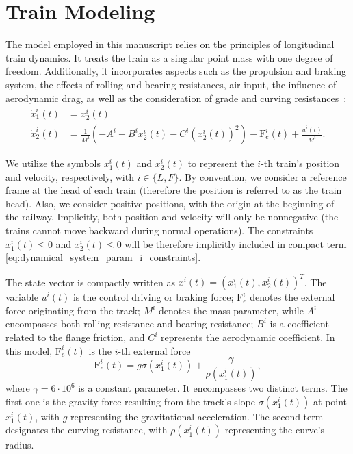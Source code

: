 \documentclass[letterpaper, 10 pt, conference]{ieeeconf}
\theoremstyle{definition}
\theoremstyle{nopoint}
\begin{document}
 \section{Train Modeling}
 \label{sec:TrainModeling}

The model employed in this manuscript relies on the principles of longitudinal train dynamics. It treats the train as a singular point mass with one degree of freedom. Additionally, it incorporates aspects such as the propulsion and braking system, the effects of rolling and bearing resistances, air input, the influence of aerodynamic drag, as well as the consideration of grade and curving resistances~\cite{ltdModel}:
%
  \begin{align}  \label{eq:stateDynamic}
 \dot{x}_1^i (t) &= x_2^i(t)  \nonumber \\
  \dot{x}_2^i(t) &= \frac{1}{M^i}(-A^i-B^i x_2^i(t) -  C^i (x_2^i(t))^2)-\mathrm{F}_e^i(t) + \frac{u^i(t)}{M^i}.
\end{align}
%

We utilize the symbols ${x}_1^i(t)$ and ${x}_2^i(t)$ to represent the $i$-th train's position and velocity, respectively, with $i\in\{L, F\}$. By convention, we consider a reference frame at the head of each train (therefore the position is referred to as the train head). 
Also, we consider positive positions, with the origin at the beginning of the railway. Implicitly, both position and velocity will only be nonnegative (the trains cannot move backward during normal operations). The constraints ${x}_1^i(t)\leq 0$ and ${x}_2^i(t)\leq 0$ will be therefore implicitly included in compact term \eqref{eq:dynamical_system_param_i_constraints}.
 
The state vector is compactly written as {$x^i(t)=(x_1^i(t),x_2^i(t))^T$}.
The variable $u^i(t)$ is the control driving or braking force; $\mathrm{F}_e^i$ denotes the external force originating from the track; $M^i$ denotes the mass parameter, while $A^i$ encompasses both rolling resistance and bearing resistance; $B^i$ is a coefficient related to the flange friction, and $C^i$ represents the aerodynamic coefficient.
%
In this model, $\mathrm{F}^i_e(t)$ is the $i$-th external force
%
\begin{equation*}
\mathrm{F}_e^i(t) = g \sigma(x_1^i(t)) + \frac{\gamma}{\rho(x_1^i(t))}, 
\end{equation*}
%
where $\gamma=6\cdot10^6$ is a constant parameter. It encompasses two distinct terms. The first one is the gravity force resulting from the track's slope $\sigma(x_1^i(t))$  at point $x_1^i(t)$, with $g$ representing the gravitational acceleration. The second term designates the curving resistance, with ${\rho(x_1^i(t))}$ representing the curve's radius.
\end{document}
